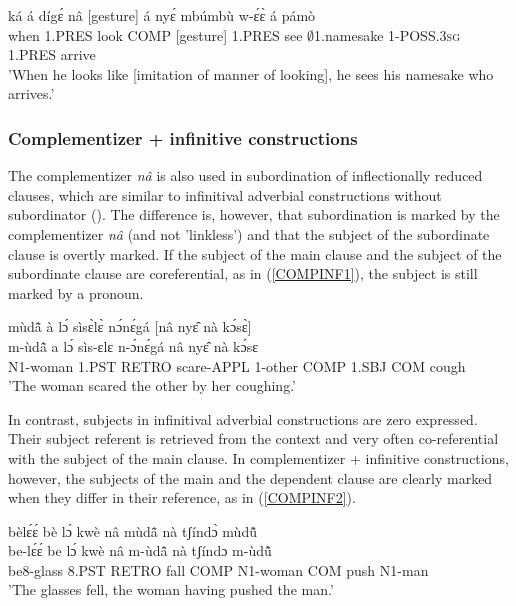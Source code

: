 \begin{exe} 
\ex\label{Gest}
  \gll ká á dígɛ́ nâ [gesture] á nyɛ́ mbúmbù w-ɛ́ɛ̀ á pámò \\
       when 1.PRES look COMP [gesture]  1.PRES see $\emptyset$1.namesake 1-POSS.3\textsc{sg} 1.PRES arrive \\
    \trans 'When he looks like [imitation of manner of looking], he sees his namesake who arrives.'
\end{exe}




\subsubsection{Complementizer + infinitive constructions}
\label{sec:COMPINF}

The complementizer {\itshape nâ} is also used in subordination of inflectionally reduced clauses, which are similar to infinitival adverbial constructions without subordinator (). The difference is, however, that subordination is marked by the complementizer {\itshape nâ} (and not 'linkless') and that the subject of the subordinate clause is overtly marked. If the subject of the main clause and the subject of the subordinate clause are coreferential,  as in (\ref{COMPINF1}), the subject is still marked by a pronoun. 

\begin{exe} 
\ex\label{COMPINF1}
  \glll mùdã̂ à lɔ́ sìsɛ̀lɛ̀ nɔ́nɛ́gá [nâ nyɛ̂ nà kɔ́sɛ̀] \\
m-ùdã̂ a lɔ́ sìs-ɛlɛ n-ɔ́nɛ́gá nâ nyɛ̂ nà kɔ́sɛ \\
N1-woman 1.PST RETRO scare-APPL 1-other COMP 1.SBJ COM cough     \\                        
  \trans 'The woman scared the other by her coughing.'
\end{exe}

In contrast, subjects in infinitival adverbial constructions are zero expressed. Their subject referent is retrieved from the context and very often co-referential with the subject of the main clause. In complementizer + infinitive constructions, however, the subjects of the main and the dependent clause are clearly marked when they differ in their reference, as in (\ref{COMPINF2}).


\begin{exe} 
\ex\label{COMPINF2}
  \glll 
bèlɛ́ɛ́ bè lɔ́ kwè nâ mùdã̂ nà tʃíndɔ̀ mùdũ̂ \\
be-lɛ́ɛ́ be lɔ́ kwè nâ m-ùdã̂ nà tʃíndɔ m-ùdũ̂ \\
be8-glass 8.PST RETRO fall COMP N1-woman COM push N1-man \\
\trans 'The glasses fell, the woman having pushed the man.'
\end{exe}


